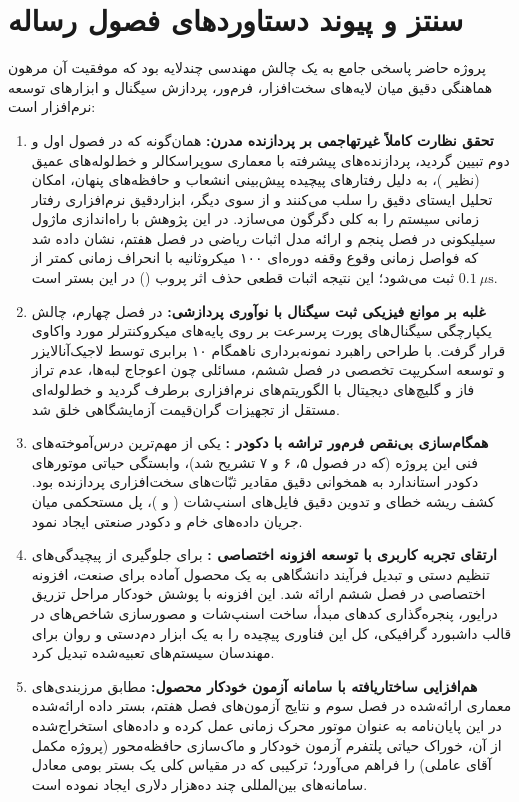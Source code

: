 \section{سنتز و پیوند دستاوردهای فصول رساله}
پروژه حاضر پاسخی جامع به یک چالش مهندسی چندلایه بود که موفقیت آن مرهون هماهنگی دقیق میان لایه‌های سخت‌افزار، فرم‌ور، پردازش سیگنال و ابزارهای توسعه نرم‌افزار است:
\begin{enumerate}
    \item \textbf{تحقق نظارت کاملاً غیرتهاجمی بر پردازنده مدرن:}
    همان‌گونه که در فصول اول و دوم تبیین گردید، پردازنده‌های پیشرفته با معماری سوپراسکالر و خط‌لوله‌های عمیق (نظیر )، به دلیل رفتارهای پیچیده پیش‌بینی انشعاب و حافظه‌های پنهان، امکان تحلیل ایستای دقیق  را سلب می‌کنند و از سوی دیگر، ابزاردقیق نرم‌افزاری رفتار زمانی سیستم را به کلی دگرگون می‌سازد. در این پژوهش با راه‌اندازی ماژول سیلیکونی  در فصل پنجم و ارائه مدل اثبات ریاضی در فصل هفتم، نشان داده شد که فواصل زمانی وقوع وقفه دوره‌ای ۱۰۰ میکروثانیه با انحراف زمانی کمتر از $0.1\ \mu\mathrm{s}$ ثبت می‌شود؛ این نتیجه اثبات قطعی حذف اثر پروب () در این بستر است.

    \item \textbf{غلبه بر موانع فیزیکی ثبت سیگنال با نوآوری پردازشی:}
    در فصل چهارم، چالش یکپارچگی سیگنال‌های پورت پرسرعت  بر روی پایه‌های میکروکنترلر مورد واکاوی قرار گرفت. با طراحی راهبرد نمونه‌برداری ناهمگام ۱۰ برابری توسط لاجیک‌آنالایزر و توسعه اسکریپت تخصصی  در فصل ششم، مسائلی چون اعوجاج لبه‌ها، عدم تراز فاز و گلیچ‌های دیجیتال با الگوریتم‌های نرم‌افزاری برطرف گردید و خط‌لوله‌ای مستقل از تجهیزات گران‌قیمت آزمایشگاهی خلق شد.

    \item \textbf{همگام‌سازی بی‌نقص فرم‌ور تراشه با دکودر :}
    یکی از مهم‌ترین درس‌آموخته‌های فنی این پروژه (که در فصول ۵، ۶ و ۷ تشریح شد)، وابستگی حیاتی موتورهای دکودر استاندارد به همخوانی دقیق مقادیر ثبّات‌های سخت‌افزاری پردازنده بود. کشف ریشه خطای  و تدوین دقیق فایل‌های اسنپ‌شات ( و )، پل مستحکمی میان جریان داده‌های خام و دکودر صنعتی ایجاد نمود.

    \item \textbf{ارتقای تجربه کاربری با توسعه افزونه اختصاصی :}
    برای جلوگیری از پیچیدگی‌های تنظیم دستی و تبدیل فرآیند دانشگاهی به یک محصول آماده برای صنعت، افزونه اختصاصی  در فصل ششم ارائه شد. این افزونه با پوشش خودکار مراحل تزریق درایور، پنجره‌گذاری کدهای مبدأ، ساخت اسنپ‌شات و مصورسازی شاخص‌های  در قالب داشبورد گرافیکی، کل این فناوری پیچیده را به یک ابزار دم‌دستی و روان برای مهندسان سیستم‌های تعبیه‌شده تبدیل کرد.

    \item \textbf{هم‌افزایی ساختاریافته با سامانه آزمون خودکار محصول:}
    مطابق مرزبندی‌های معماری ارائه‌شده در فصل سوم و نتایج آزمون‌های فصل هفتم، بستر داده ارائه‌شده در این پایان‌نامه به عنوان موتور محرک زمانی عمل کرده و داده‌های استخراج‌شده از آن، خوراک حیاتی پلتفرم آزمون خودکار و ماک‌سازی حافظه‌محور (پروژه مکمل آقای عاملی) را فراهم می‌آورد؛ ترکیبی که در مقیاس کلی یک بستر بومی معادل سامانه‌های بین‌المللی چند ده‌هزار دلاری ایجاد نموده است.
\end{enumerate}

